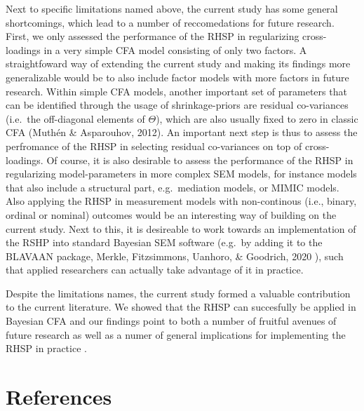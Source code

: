 \documentclass[
  english,
  man, donotrepeattitle,floatsintext]{apa6}
\begin{document}
Next to specific limitations named above, the current study has some general shortcomings, which lead to a number of reccomedations for future research. First, we only assessed the performance of the RHSP in regularizing cross-loadings in a very simple CFA model consisting of only two factors. A straightfoward way of extending the current study and making its findings more generalizable would be to also include factor models with more factors in future research. Within simple CFA models, another important set of parameters that can be identified through the usage of shrinkage-priors are residual co-variances (i.e.~the off-diagonal elements of \(\Theta\)), which are also usually fixed to zero in classic CFA (Muthén \& Asparouhov, 2012). An important next step is thus to assess the perfromance of the RHSP in selecting residual co-variances on top of cross-loadings. Of course, it is also desirable to assess the performance of the RHSP in regularizing model-parameters in more complex SEM models, for instance models that also include a structural part, e.g.~mediation models, or MIMIC models. Also applying the RHSP in measurement models with non-continous (i.e., binary, ordinal or nominal) outcomes would be an interesting way of building on the current study. Next to this, it is desireable to work towards an implementation of the RSHP into standard Bayesian SEM software (e.g.~by adding it to the BLAVAAN package, Merkle, Fitzsimmons, Uanhoro, \& Goodrich, 2020 ), such that applied researchers can actually take advantage of it in practice.

Despite the limitations names, the current study formed a valuable contribution to the current literature. We showed that the RHSP can succesfully be applied in Bayesian CFA and our findings point to both a number of fruitful avenues of future research as well as a numer of general implications for implementing the RHSP in practice .

\clearpage

\hypertarget{references}{%
\section{References}\label{references}}

\begingroup
\setlength{\parindent}{-0.5in}
\setlength{\leftskip}{0.5in}
\end{document}
